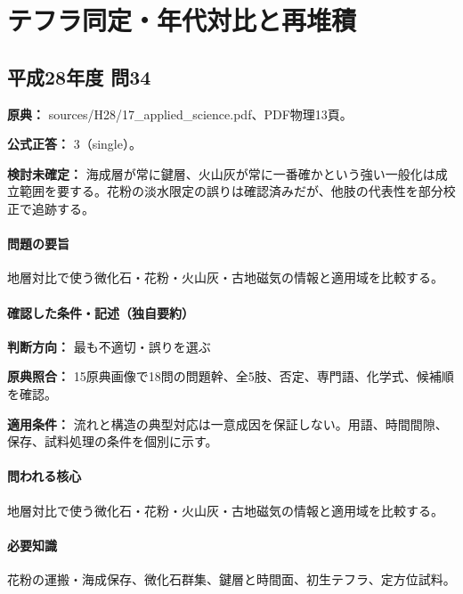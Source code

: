 \section{テフラ同定・年代対比と再堆積}

\subsection{平成28年度 問34}
\label{q:h28-reg-applied-34}

\noindent\textbf{原典：} sources/H28/17\_applied\_science.pdf、PDF物理13頁。

\textbf{公式正答：} 3（single）。

\par\textbf{検討未確定：} 海成層が常に鍵層、火山灰が常に一番確かという強い一般化は成立範囲を要する。花粉の淡水限定の誤りは確認済みだが、他肢の代表性を部分校正で追跡する。

\paragraph{問題の要旨} 地層対比で使う微化石・花粉・火山灰・古地磁気の情報と適用域を比較する。

\paragraph{確認した条件・記述（独自要約）}\mbox{}\par

\noindent\textbf{判断方向：} 最も不適切・誤りを選ぶ\par

\noindent\textbf{原典照合：} 15原典画像で18問の問題幹、全5肢、否定、専門語、化学式、候補順を確認。\par

\noindent\textbf{適用条件：} 流れと構造の典型対応は一意成因を保証しない。用語、時間間隙、保存、試料処理の条件を個別に示す。\par

\paragraph{問われる核心} 地層対比で使う微化石・花粉・火山灰・古地磁気の情報と適用域を比較する。

\paragraph{必要知識} 花粉の運搬・海成保存、微化石群集、鍵層と時間面、初生テフラ、定方位試料。

